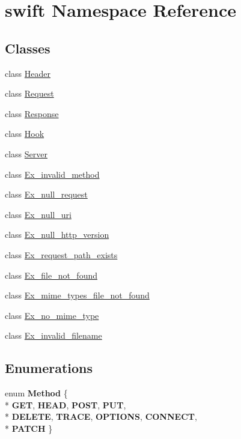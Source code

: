 \hypertarget{namespaceswift}{\section{swift Namespace Reference}
\label{namespaceswift}
}
\subsection*{Classes}
\begin{DoxyCompactItemize}
\item 
class \hyperlink{classswift_1_1_header}{Header}
\item 
class \hyperlink{classswift_1_1_request}{Request}
\item 
class \hyperlink{classswift_1_1_response}{Response}
\item 
class \hyperlink{classswift_1_1_hook}{Hook}
\item 
class \hyperlink{classswift_1_1_server}{Server}
\item 
class \hyperlink{classswift_1_1_ex__invalid__method}{Ex\-\_\-invalid\-\_\-method}
\item 
class \hyperlink{classswift_1_1_ex__null__request}{Ex\-\_\-null\-\_\-request}
\item 
class \hyperlink{classswift_1_1_ex__null__uri}{Ex\-\_\-null\-\_\-uri}
\item 
class \hyperlink{classswift_1_1_ex__null__http__version}{Ex\-\_\-null\-\_\-http\-\_\-version}
\item 
class \hyperlink{classswift_1_1_ex__request__path__exists}{Ex\-\_\-request\-\_\-path\-\_\-exists}
\item 
class \hyperlink{classswift_1_1_ex__file__not__found}{Ex\-\_\-file\-\_\-not\-\_\-found}
\item 
class \hyperlink{classswift_1_1_ex__mime__types__file__not__found}{Ex\-\_\-mime\-\_\-types\-\_\-file\-\_\-not\-\_\-found}
\item 
class \hyperlink{classswift_1_1_ex__no__mime__type}{Ex\-\_\-no\-\_\-mime\-\_\-type}
\item 
class \hyperlink{classswift_1_1_ex__invalid__filename}{Ex\-\_\-invalid\-\_\-filename}
\end{DoxyCompactItemize}
\subsection*{Enumerations}
\begin{DoxyCompactItemize}
\item 
enum {\bfseries Method} \{ \\*
{\bfseries G\-E\-T}, 
{\bfseries H\-E\-A\-D}, 
{\bfseries P\-O\-S\-T}, 
{\bfseries P\-U\-T}, 
\\*
{\bfseries D\-E\-L\-E\-T\-E}, 
{\bfseries T\-R\-A\-C\-E}, 
{\bfseries O\-P\-T\-I\-O\-N\-S}, 
{\bfseries C\-O\-N\-N\-E\-C\-T}, 
\\*
{\bfseries P\-A\-T\-C\-H}
 \}
\end{DoxyCompactItemize}
